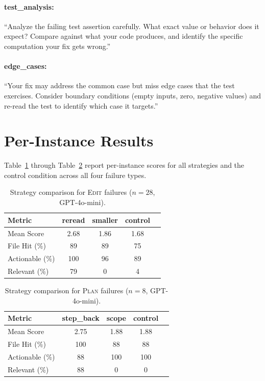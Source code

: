 \documentclass[11pt]{article}
\begin{document}
\paragraph{test\_analysis:} ``Analyze the failing test assertion carefully. What exact value or behavior does it expect? Compare against what your code produces, and identify the specific computation your fix gets wrong.''

\paragraph{edge\_cases:} ``Your fix may address the common case but miss edge cases that the test exercises. Consider boundary conditions (empty inputs, zero, negative values) and re-read the test to identify which case it targets.''


\section{Per-Instance Results}
\label{app:per-instance}

Table~\ref{tab:per-instance-edit} through Table~\ref{tab:per-instance-plan} report per-instance scores for all strategies and the control condition across all four failure types.

\begin{table}[t]
\centering
\small
\begin{tabular}{@{}lcccc@{}}
\toprule
\textbf{Metric} & \textbf{reread} & \textbf{smaller} & \textbf{control} \\
\midrule
Mean Score & 2.68 & 1.86 & 1.68 \\
File Hit (\%) & 89 & 89 & 75 \\
Actionable (\%) & 100 & 96 & 89 \\
Relevant (\%) & 79 & 0 & 4 \\
\bottomrule
\end{tabular}
\caption{Strategy comparison for \textsc{Edit} failures ($n=28$, GPT-4o-mini).}
\label{tab:per-instance-edit}
\end{table}

\begin{table}[t]
\centering
\small
\begin{tabular}{@{}lcccc@{}}
\toprule
\textbf{Metric} & \textbf{step\_back} & \textbf{scope} & \textbf{control} \\
\midrule
Mean Score & 2.75 & 1.88 & 1.88 \\
File Hit (\%) & 100 & 88 & 88 \\
Actionable (\%) & 88 & 100 & 100 \\
Relevant (\%) & 88 & 0 & 0 \\
\bottomrule
\end{tabular}
\caption{Strategy comparison for \textsc{Plan} failures ($n=8$, GPT-4o-mini).}
\label{tab:per-instance-plan}
\end{table}
\end{document}
